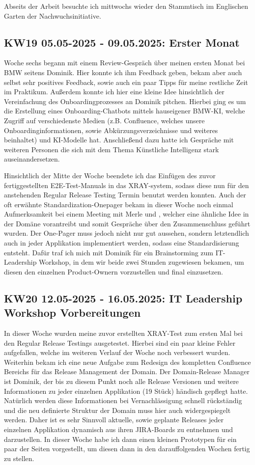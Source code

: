 Abseits der Arbeit besuchte ich mittwochs wieder den Stammtisch im Englischen Garten der Nachwuchsinitiative.


\subsection{KW19 05.05-2025 - 09.05.2025: Erster Monat}
Woche sechs begann mit einem Review-Gespräch über meinen ersten Monat bei BMW seitens Dominik. 
Hier konnte ich ihm Feedback geben, bekam aber auch selbst sehr positives Feedback, sowie auch ein paar Tipps für meine restliche Zeit im Praktikum.
Außerdem konnte ich hier eine kleine Idee hinsichtlich der Vereinfachung des Onboardingprozesses an Dominik pitchen. 
Hierbei ging es um die Erstellung eines Onboarding-Chatbots mittels hauseigener BMW-KI, welche Zugriff auf verschiedenste Medien (z.B. Confluence, welches unsere Onboardinginformationen, sowie Abkürzungsverzeichnisse und weiteres beinhaltet) und KI-Modelle hat.
Anschließend dazu hatte ich Gespräche mit weiteren Personen die sich mit dem Thema Künstliche Intelligenz stark auseinandersetzen.

Hinsichtlich der Mitte der Woche beendete ich das Einfügen des zuvor fertiggestellten \ac{E2E}-Test-Manuals in das XRAY-system, sodass diese nun für den anstehenden Regular Release Testing Termin benutzt werden konnten.
Auch der oft erwähnte Standardization-Onepager bekam in dieser Woche noch einmal Aufmerksamkeit bei einem Meeting mit Merle und 
, welcher eine ähnliche Idee in der Domäne vorantreibt und somit Gespräche über den Zusammenschluss geführt wurden.
Der One-Pager muss jedoch nicht nur gut aussehen, sondern letztendlich auch in jeder Applikation implementiert werden, sodass eine Standardisierung entsteht.
Dafür traf ich mich mit Dominik für ein Brainstorming zum IT-Leadership Workshop, in dem wir beide zwei Stunden zugewiesen bekamen, um diesen den einzelnen Product-Ownern vorzustellen und final einzusetzen.


\subsection{KW20 12.05-2025 - 16.05.2025: IT Leadership Workshop Vorbereitungen}
In dieser Woche wurden meine zuvor erstellten XRAY-Test zum ersten Mal bei den Regular Release Testings ausgetestet.
Hierbei sind ein paar kleine Fehler aufgefallen, welche im weiteren Verlauf der Woche noch verbessert wurden.
Weiterhin bekam ich eine neue Aufgabe zum Redesign des kompletten Confluence Bereichs für das Release Management der Domain.
Der Domain-Release Manager ist Dominik, der bis zu diesem Punkt noch alle Release Versionen und weitere Informationen zu jeder einzelnen Applikation (19 Stück) händisch gepflegt hatte.
Natürlich werden diese Informationen bei Vernachlässigung schnell rückständig und die neu definierte Struktur der Domain muss hier auch widergespiegelt werden.
Daher ist es sehr Sinnvoll aktuelle, sowie geplante Releases jeder einzelnen Applikation dynamisch aus ihren JIRA-Boards zu entnehmen und darzustellen. 
In dieser Woche habe ich dann einen kleinen Prototypen für ein paar der Seiten vorgestellt, um diesen dann in den darauffolgenden Wochen fertig zu stellen.

